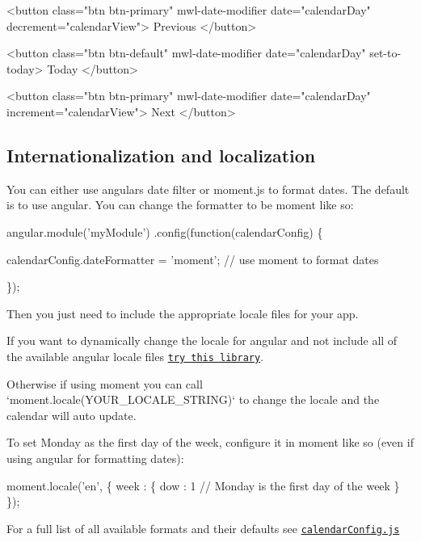 \begin{DoxyCode}
<button
  class="btn btn-primary"
  mwl-date-modifier
  date="calendarDay"
  decrement="calendarView">
  Previous
</button>

<button
  class="btn btn-default"
  mwl-date-modifier
  date="calendarDay"
  set-to-today>
  Today
</button>

<button
  class="btn btn-primary"
  mwl-date-modifier
  date="calendarDay"
  increment="calendarView">
  Next
</button>
\end{DoxyCode}


\subsection*{Internationalization and localization}

You can either use angular\textquotesingle{}s date filter or moment.\+js to format dates. The default is to use angular. You can change the formatter to be moment like so\+:


\begin{DoxyCode}
angular.module('myModule')
  .config(function(calendarConfig) \{

    calendarConfig.dateFormatter = 'moment'; // use moment to format dates

  \});
\end{DoxyCode}


Then you just need to include the appropriate locale files for your app.

If you want to dynamically change the locale for angular and not include all of the available angular locale files \href{https://github.com/lgalfaso/angular-dynamic-locale}{\tt try this library}.

Otherwise if using moment you can call `moment.locale(\textquotesingle{}Y\+O\+U\+R\+\_\+\+L\+O\+C\+A\+L\+E\+\_\+\+S\+T\+R\+I\+NG\textquotesingle{})` to change the locale and the calendar will auto update.

To set Monday as the first day of the week, configure it in moment like so (even if using angular for formatting dates)\+: 
\begin{DoxyCode}
moment.locale('en', \{
  week : \{
    dow : 1 // Monday is the first day of the week
  \}
\});
\end{DoxyCode}


For a full list of all available formats and their defaults see \href{https://github.com/mattlewis92/angular-bootstrap-calendar/blob/master/src/services/calendarConfig.js}{\tt calendar\+Config.\+js}

